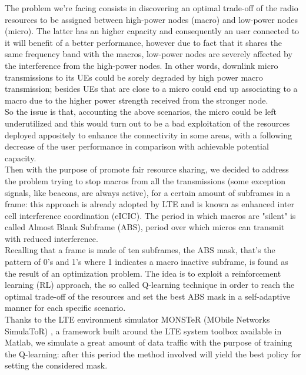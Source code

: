 \documentclass[conference,10pt]{IEEEtran}
\begin{document}
The problem we're facing consists in discovering an optimal trade-off of the radio resources to be assigned between high-power nodes (macro) and low-power nodes (micro). The latter has an higher capacity and consequently an user connected to it will benefit of a better performance, however due to fact that it shares the same frequency band with the macros, low-power nodes are severely affected by the interference from the high-power nodes. In other words, downlink micro transmissions to its UEs could be sorely degraded by high power macro transmission; besides UEs that are close to a micro could end up associating to a macro due to the higher power strength received from the stronger node.\\
So the issue is that, accounting the above scenarios, the micro could be left underutilized and this would turn out to be a bad exploitation of the resources deployed appositely to enhance the connectivity in some areas, with a following decrease of the user performance in comparison with achievable potential capacity.\\
Then with the purpose of promote fair resource sharing, we decided to address the problem trying to stop macros from all the transmissions (some exception signals, like beacons, are always active), for a certain amount of subframes in a frame: this approach is already adopted by LTE and is known as enhanced inter cell interference coordination (eICIC). The period in which macros are "silent" is called Almost Blank Subframe (ABS), period over which micros can transmit with reduced interference.\\
Recalling that a frame is made of ten subframes, the ABS mask, that's the pattern of 0's and 1's where 1 indicates a macro inactive subframe, is found as the result of an optimization problem. The idea is to exploit a reinforcement learning (RL) approach, the so called Q-learning technique in order to reach the optimal trade-off of the resources and set the best ABS mask in a self-adaptive manner for each specific scenario.\\
Thanks to the LTE environment simulator MONSTeR (MObile Networks SimulaToR) \cite{monster}, a framework built around the LTE system toolbox available in Matlab, we simulate a great amount of data traffic with the purpose of training the Q-learning: after this period the method involved will yield the best policy for setting the considered mask.
\end{document}
